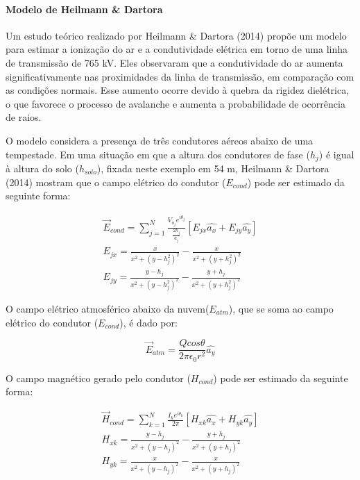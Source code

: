 \documentclass[a4paper, 12pt, onecolumn,singlespacing]{article}
\begin{document}
		\paragraph{Modelo de Heilmann \& Dartora}
		
		Um estudo teórico realizado por Heilmann \& Dartora (2014) propõe um modelo para estimar a ionização do ar e a condutividade elétrica em torno de uma linha de transmissão de 765 kV. Eles observaram que a condutividade do ar aumenta significativamente nas proximidades da linha de transmissão, em comparação com as condições normais. Esse aumento ocorre devido à quebra da rigidez dielétrica, o que favorece o processo de avalanche e aumenta a probabilidade de ocorrência de raios.
		
		O modelo considera a presença de três condutores aéreos abaixo de uma tempestade. Em uma situação em que a altura dos condutores de fase ($h_j$) é igual à altura do solo ($h_{solo}$), fixada neste exemplo em 54 m, Heilmann \& Dartora (2014) mostram que o campo elétrico do condutor ($E_{cond}$) pode ser estimado da seguinte forma:
		
		\begin{equation}	
			\begin{split}
			\vec E_{cond} = \sum_{j=1}^{N} \frac{V_{o_j} e^{i\theta_j}}{\frac{2h_j}{a_j}} \left[E_{jx} \hat{a_x} + E_{jy} \hat{a_y}\right]\\
			E_{jx} =  \frac{x}{x^2 + ( y - h_j^2)^2} - \frac{x}{x^2 + ( y + h_j^2)^2}\\
			E_{jy} = \frac{y -h_j}{x^2 + ( y - h_j^2)^2} - \frac{y + h_j}{x^2 + ( y + h_j^2)^2}
			\end{split}
		\end{equation}
	
		O campo elétrico atmosférico abaixo da nuvem($E_{atm}$), que se soma ao campo elétrico do condutor ($E_{cond}$), é dado por:
		
		\begin{equation}
			\vec E_{atm} = \frac{Q cos\theta}{2 \pi \epsilon_0 r^2} \hat{a_y}
		\end{equation}
		
		O campo magnético gerado pelo condutor ($H_{cond}$) pode ser estimado da seguinte forma:
		
		\begin{equation}	
			\begin{split}
				\vec H_{cond} = \sum_{k=1}^{N} \frac{I_{k} e^{i\theta_k}}{2 \pi} \left[H_{xk} \hat{a_x} + H_{yk} \hat{a_y}\right]\\
				H_{xk} = \frac{y -h_j}{x^2 + ( y - h_j)^2} - \frac{y + h_j}{x^2 + ( y + h_j)^2}\\
				H_{yk} =  \frac{x}{x^2 + ( y - h_j)^2} - \frac{x}{x^2 + ( y + h_j)^2}
			\end{split}
		\end{equation}
	
\end{document}
